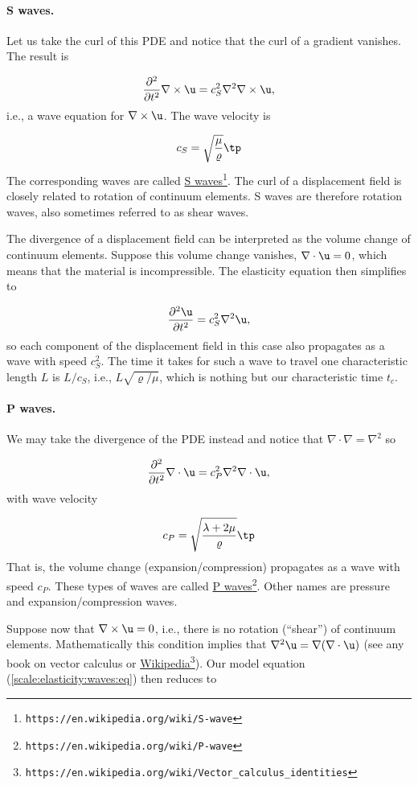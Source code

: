 \documentclass[graybox,envcountchap,sectrefs,final]{svmonodo}
\begin{document}
\paragraph{S waves.}
Let us take the curl of this PDE and notice
that the curl of a  gradient vanishes. The result is

\[\frac{\partial^2}{\partial t^2}\nabla\times\u = c_S^2\nabla^2\nabla\times\u,\]
i.e., a wave equation for $\nabla\times\u$. The wave velocity is

\[ c_S = \sqrt{\frac{\mu}{\varrho}}\tp\]
The corresponding waves are called
\href{{https://en.wikipedia.org/wiki/S-wave}}{S waves}\footnote{\texttt{https://en.wikipedia.org/wiki/S-wave}}. The curl of a
displacement field is closely related to rotation of continuum elements.
S waves are therefore rotation waves, also sometimes referred to as
shear waves.

The divergence of a displacement field can be interpreted as the
volume change of continuum elements. Suppose this volume change vanishes,
$\nabla\cdot\u = 0$, which means that the material is incompressible.
The elasticity equation then simplifies to

\[\frac{\partial^2 \u}{\partial t^2} = c_S^2\nabla^2\u,\]
\label{scale:elasticity:waves:Sweq}
so each component of
the displacement field in this case also propagates as a wave
with speed $c_S^2$.
The time it takes for such a wave to travel one characteristic length
$L$ is $L/c_S$, i.e., $L\sqrt{\varrho/\mu}$, which is nothing but
our characteristic time $t_c$.

\paragraph{P waves.}
We may take the divergence of the PDE instead and notice that $\nabla\cdot\nabla
=\nabla^2$ so

\[\frac{\partial^2}{\partial t^2}\nabla\cdot\u = c_P^2\nabla^2\nabla\cdot\u,\]
with wave velocity

\[ c_P = \sqrt{\frac{\lambda +2\mu}{\varrho}}\tp\]
That is, the volume change (expansion/compression)
propagates as a wave with speed $c_P$.
These types of waves are called \href{{https://en.wikipedia.org/wiki/P-wave}}{P waves}\footnote{\texttt{https://en.wikipedia.org/wiki/P-wave}}. Other names are pressure and expansion/compression waves.

Suppose now that $\nabla\times\u =0$, i.e., there is no rotation (``shear'') of
continuum elements. Mathematically this condition implies that
$\nabla^2\u = \nabla(\nabla\cdot\u)$ (see any book on vector calculus
or \href{{https://en.wikipedia.org/wiki/Vector_calculus_identities}}{Wikipedia}\footnote{\texttt{https://en.wikipedia.org/wiki/Vector\_calculus\_identities}}).
Our model equation (\ref{scale:elasticity:waves:eq}) then reduces to
\end{document}
